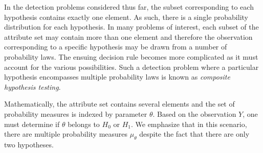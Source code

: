 In the detection problems considered thus far, the subset corresponding to each hypothesis contains exactly one element.
As such, there is a single probability distribution for each hypothesis.
In many problems of interest, each subset of the attribute set may contain more than one element and therefore the observation corresponding to a specific hypothesis may be drawn from a number of probability laws.
The ensuing decision rule becomes more complicated as it must account for the various possibilities.
Such a detection problem where a particular hypothesis encompasses multiple probability laws is known as \emph{composite hypothesis testing}.

Mathematically, the attribute set contains several elements and the set of probability measures is indexed by parameter $\theta$.
Based on the observation $Y$, one must determine if $\theta$ belongs to $H_0$ or $H_1$.
We emphasize that in this scenario, there are multiple probability measures $\mu_{\theta}$ despite the fact that there are only two hypotheses.

